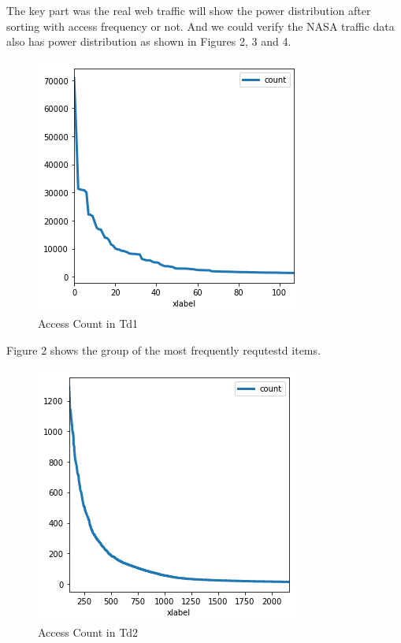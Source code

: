 \documentclass[sigconf,anonymous=true]{acmart}
\begin{document}
\begin{itemize}
The key part was the real web traffic will show the power distribution after sorting with access frequency or not. And we could verify the NASA traffic data also has power distribution as shown in Figures 2, 3 and 4.
\end{itemize}

\begin{figure}[H]
    \centering
    \includegraphics[width=0.85\columnwidth]{figs/figure_02_td1.png}
    \caption{Access Count in Td1}
    \label{fig:fig3}
\end{figure}
Figure 2 shows the group of the most frequently requtestd items. 

\begin{figure}[H]
    \centering
    \includegraphics[width=0.85\columnwidth]{figs/figure_03_td2.png}
    \caption{Access Count in Td2}
    \label{fig:fig4}
\end{figure}
\end{document}
